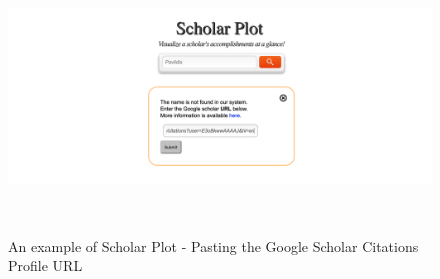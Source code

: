 \begin{figure}
  \centering
  \includegraphics[width=1\textwidth]{figures/Support-5}
  \caption{An example of Scholar Plot - Pasting the Google Scholar Citations Profile URL}~\label{fig:Support-5}
\end{figure}





% 
% 
% 
% 
% 



